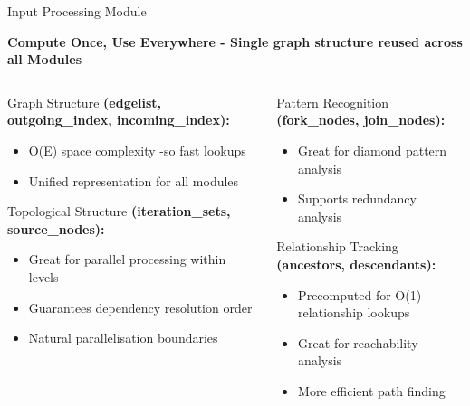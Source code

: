 \documentclass[aspectratio=169]{beamer}
\begin{document}
\begin{frame}{\textcolor{juliagreen}{Input Processing Module }}

\begin{center}
\textbf{\textcolor{juliagreen}{Compute Once, Use Everywhere - Single graph structure reused across all Modules}}
\end{center}

\begin{columns}
\begin{column}{0.48\textwidth}
\begin{block}{\textcolor{juliagreen}{Graph Structure}}
\small
\textbf{(edgelist, outgoing\_index, incoming\_index):}
\begin{itemize}
\item O(E) space complexity -so fast lookups
\item Unified representation for all modules
\end{itemize}
\end{block}

\begin{block}{\textcolor{juliagreen}{Topological Structure}}
\small
\textbf{(iteration\_sets, source\_nodes):}
\begin{itemize}
\item Great for parallel processing within levels
\item Guarantees dependency resolution order
\item Natural parallelisation boundaries
\end{itemize}
\end{block}
\end{column}

\begin{column}{0.48\textwidth}
\begin{block}{\textcolor{juliagreen}{Pattern Recognition}}
\small
\textbf{(fork\_nodes, join\_nodes):}
\begin{itemize}
\item Great for diamond pattern analysis
\item Supports redundancy analysis
\end{itemize}
\end{block}

\begin{block}{\textcolor{juliagreen}{Relationship Tracking}}
\small
\textbf{(ancestors, descendants):}
\begin{itemize}
\item Precomputed for O(1) relationship lookups
\item Great for reachability analysis
\item More efficient path finding
\end{itemize}
\end{block}
\end{column}
\end{columns}


\end{frame}
\end{document}
